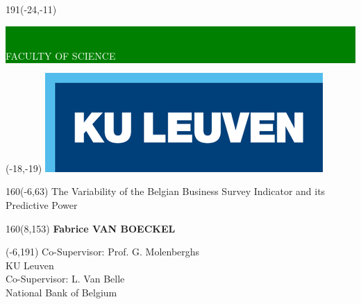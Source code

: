\documentclass[12pt,a4paper,oneside]{book}
\begin{document}
\thispagestyle{empty}
\newcommand{\form}[1]{\scalebox{1.087}{\boldmath{#1}}}
\sffamily
%
\begin{textblock}{191}(-24,-11)
\colorbox{green}{\hspace{139mm}\ \parbox[c][18truemm]{52mm}{\textcolor{white}{FACULTY OF SCIENCE}}}
\end{textblock}
%
\begin{textblock}{70}(-18,-19)
\textblockcolour{}
\includegraphics*[height=19.8truemm]{LogoKULeuven}
\end{textblock}
%
\begin{textblock}{160}(-6,63)
\textblockcolour{}
\vspace{-\parskip}
\flushleft
\fontsize{40}{42}\selectfont \textcolor{bluetitle}{The Variability of the Belgian Business Survey Indicator and its Predictive Power}\\[1.5mm]
\end{textblock}
%
%
\begin{textblock}{160}(8,153)
\textblockcolour{}
\vspace{-\parskip}
\flushright
\fontsize{14}{16}\selectfont \textbf{Fabrice VAN BOECKEL}
\end{textblock}
%
\begin{textblock}{70}(-6,191)
\textblockcolour{}
\vspace{-\parskip}
\flushleft
Co-Supervisor: Prof. G. Molenberghs\\[-2pt]
\textcolor{blueaff}{KU Leuven}\\[5pt]
Co-Supervisor: L. Van Belle\\[-2pt]
\textcolor{blueaff}{National Bank of Belgium}\\[5pt]
\end{textblock}
\end{document}
